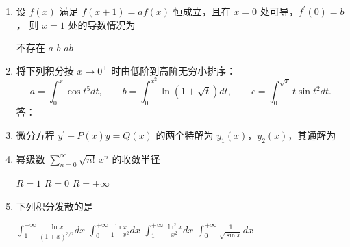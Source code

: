 \begin{enumerate}
\begin{enumerate}
\fourchoices
{$a=0$}
{$a=\sqrt{2}$}
{$a=1$}
{$a=2$}


\item
设 $f(x)$ 满足 $f(x+1)=a f(x)$ 恒成立，且在 $x=0$ 处可导，$f^{\prime}(0)=b$，
则 $x=1$ 处的导数情况为 

\fourchoices
{不存在}
{$a$}
{$b$}
{$a b$}


\item
将下列积分按 $x \rightarrow 0^{+}$ 时由低阶到高阶无穷小排序：
\[
a=\int_0^x \cos t^5 d t,\qquad b=\int_0^{x^2} \ln (1+\sqrt{t}) d t,\qquad
c=\int_0^{\sqrt{x}} t \sin t^2 d t .
\]
答： 


\item
微分方程 $y^{\prime}+P(x) y=Q(x)$ 的两个特解为 $y_1(x)$，$y_2(x)$，其通解为

\hspace*{2em}


\item
幂级数 $\sum\limits_{n=0}^{\infty} \sqrt{n!}\, x^n$ 的收敛半径 

\threechoices
{$R=1$}
{$R=0$}
{$R=+\infty$}


\item
下列积分发散的是 

\fourchoices
{$\int_1^{+\infty} \frac{\ln x}{(1+x)^{3 / 2}} d x$}
{$\int_0^{+\infty} \frac{\ln x}{1-x^2} d x$}
{$\int_1^{+\infty} \frac{\ln ^2 x}{x^2} d x$}
{$\int_0^{+\infty} \frac{1}{\sqrt{\sin x}} d x$}


\end{enumerate}


\end{enumerate}
